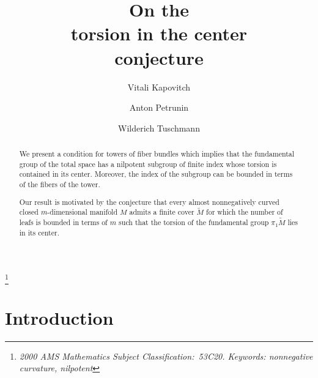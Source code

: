 \documentclass{amsart}
\begin{document}
\title[The torsion in the center conjecture]{On the\\ torsion in the center\\ conjecture} %
\thanks{\it 2000 AMS Mathematics Subject Classification:\rm\
53C20. Keywords: nonnegative curvature, nilpotent}\rm
\author{Vitali Kapovitch}
\address{Vitali Kapovitch\\Department of Mathematics\\University of Toronto\\
Toronto, Ontario, M5S 2E4, Canada.}\email{vtk@math.toronto.edu}
\author{Anton Petrunin }\address{Anton Petrunin\\ Department of Mathematics\\ Pennsylvania State University\\
University Park, State College, PA 16802, USA.
}
\author{Wilderich Tuschmann}\address{Wilderich Tuschmann
\\Arbeitsgruppe Differentialgeometrie
\\Institut f\"ur Algebra und Geometrie
\\Fakult\"at f\"ur Mathematik
\\Karlsruher Institut f\"ur Technologie
\\Englerstr. 2
\\D-76131 Karlsruhe, Deutschland.}

\maketitle
\begin{abstract}
We present a condition for towers of fiber bundles which implies that the fundamental group of 
the total space has a nilpotent subgroup of finite index whose torsion is contained in its center.
Moreover, the index of the subgroup can be bounded in terms of the fibers of the tower.

Our result is motivated by the conjecture that
every almost nonnegatively curved closed $m$-dimensional manifold $M$ 
admits a finite cover $\tilde M$ for which the number of leafs is bounded in terms of $m$
such that the torsion of the fundamental group $\pi_1 \tilde M$ lies in its center.
\end{abstract}


\section{Introduction}
\end{document}
